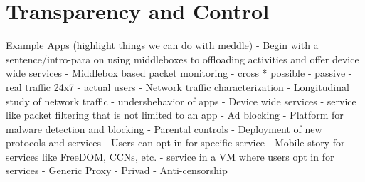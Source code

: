 \section{Transparency and Control}
Example Apps (highlight things we can do with meddle)
 - Begin with a sentence/intro-para on using middleboxes to offloading activities and offer device wide services
 - Middlebox based packet monitoring 
      - cross * possible
      - passive - real traffic 24x7 
      - actual users
      - Network traffic characterization
         - Longitudinal study of network traffic
         - undersbehavior of apps
 - Device wide services - service like packet filtering that is not limited to an app 
     - Ad blocking
     - Platform for malware detection and blocking
     - Parental controls 
 - Deployment of new protocols and services 
   - Users can opt in for specific service
   - Mobile story for services like FreeDOM, CCNs, etc.
   - service in a VM where users opt in for services
 - Generic Proxy
   - Privad
   - Anti-censorship